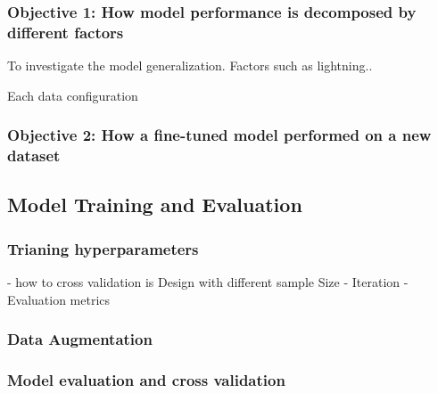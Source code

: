 \subsubsection*{Objective 1: How model performance is decomposed by different factors}
To investigate the model generalization. Factors such as lightning..

Each data configuration

\subsubsection*{Objective 2: How a fine-tuned model performed on a new dataset}

\subsection*{Model Training and Evaluation}

\subsubsection*{Trianing hyperparameters}

- how to cross validation is Design with different sample Size
- Iteration
- Evaluation metrics

\subsubsection*{Data Augmentation}

\subsubsection*{Model evaluation and cross validation}


